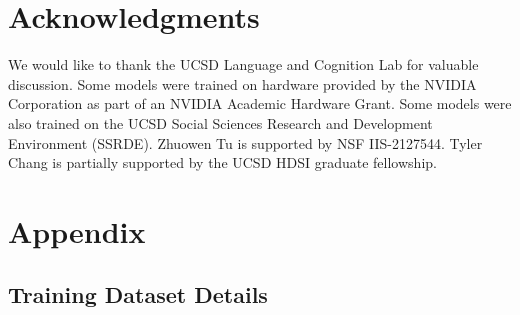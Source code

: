 \documentclass[11pt]{article}
\begin{document}
\section*{Acknowledgments}
We would like to thank the UCSD Language and Cognition Lab for valuable discussion.
Some models were trained on hardware provided by the NVIDIA Corporation as part of an NVIDIA Academic Hardware Grant.
Some models were also trained on the UCSD Social Sciences Research and Development Environment (SSRDE). 
Zhuowen Tu is supported by NSF IIS-2127544.
Tyler Chang is partially supported by the UCSD HDSI graduate fellowship.

%


\appendix

\section{Appendix}
\label{sec:appendix}

\subsection{Training Dataset Details}
\label{app:dataset-details}
\end{document}
